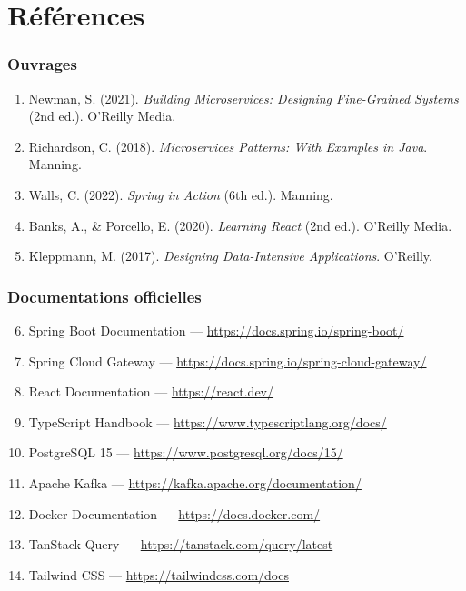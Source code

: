 \documentclass[12pt,a4paper,oneside]{report}
\begin{document}
\chapter*{Références}

\subsection*{Ouvrages}
\begin{enumerate}
    \item Newman, S. (2021). \textit{Building Microservices: Designing Fine-Grained Systems} (2nd ed.). O'Reilly Media.
    \item Richardson, C. (2018). \textit{Microservices Patterns: With Examples in Java}. Manning.
    \item Walls, C. (2022). \textit{Spring in Action} (6th ed.). Manning.
    \item Banks, A., \& Porcello, E. (2020). \textit{Learning React} (2nd ed.). O'Reilly Media.
    \item Kleppmann, M. (2017). \textit{Designing Data-Intensive Applications}. O'Reilly.
\end{enumerate}

\subsection*{Documentations officielles}
\begin{enumerate}\setcounter{enumi}{5}
    \item Spring Boot Documentation --- \url{https://docs.spring.io/spring-boot/}
    \item Spring Cloud Gateway --- \url{https://docs.spring.io/spring-cloud-gateway/}
    \item React Documentation --- \url{https://react.dev/}
    \item TypeScript Handbook --- \url{https://www.typescriptlang.org/docs/}
    \item PostgreSQL 15 --- \url{https://www.postgresql.org/docs/15/}
    \item Apache Kafka --- \url{https://kafka.apache.org/documentation/}
    \item Docker Documentation --- \url{https://docs.docker.com/}
    \item TanStack Query --- \url{https://tanstack.com/query/latest}
    \item Tailwind CSS --- \url{https://tailwindcss.com/docs}
\end{enumerate}
\end{document}
